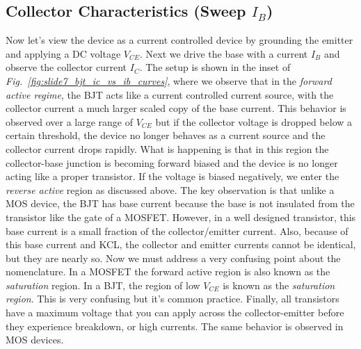 \subsection{Collector Characteristics \texorpdfstring{(Sweep $I_B$)}{}}
Now let's view the device as a current controlled device by grounding the emitter and applying a DC voltage $V_{CE}$.  Next we drive the base with a current $I_B$ and observe the collector current $I_C$.  The setup is shown in the inset of \emph{Fig.~\ref{fig:slide7_bjt_ic_vs_ib_curves}}, where we observe that in the \emph{forward active regime}, the BJT acts like a current controlled current source, with the collector current a much larger scaled copy of the base current.  This behavior is observed over a large range of $V_{CE}$ but if the collector voltage is dropped below a certain threshold, the device no longer behaves as a current source and the collector current drops rapidly.  What is happening is that in this region the collector-base junction is becoming forward biased and the device is no longer acting like a proper transistor. If the voltage is biased negatively, we enter the \emph{reverse active} region as discussed above.
The key observation is that unlike a MOS device, the BJT has base current because the base is not insulated from the transistor like the gate of a MOSFET.  However, in a well designed transistor, this base current is a small fraction of the collector/emitter current.  Also, because of this base current and KCL, the collector and emitter currents cannot be identical, but they are nearly so.
Now we must address a very confusing point about the nomenclature.  In a MOSFET the forward active region is also known as the \emph{saturation} region.  In a BJT, the region of low $V_{CE}$ is known as the \emph{saturation region}.  This is very confusing but it's common practice.
Finally, all transistors have a maximum voltage that you can apply across the collector-emitter before they experience breakdown, or high currents.  The same behavior is observed in MOS devices.  
